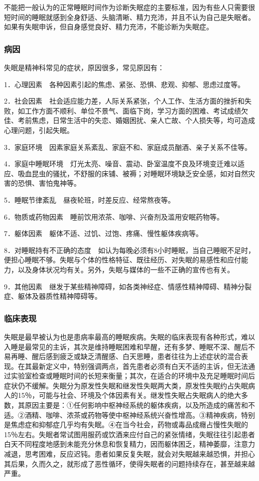 不能把一般认为的正常睡眠时间作为诊断失眠症的主要标准，因为有些人只需要很短时间的睡眠就感到全身舒适、头脑清晰、精力充沛，并且不认为自己是失眠者。如果有失眠申诉，但自身感觉良好、精力充沛，不能诊断为失眠症。

\subsubsection{病因}

失眠是精神科常见的症状，原因很多，常见原因有：

1．心理因素　各种因素引起的焦虑、紧张、恐惧、悲观、抑郁、思虑过度等。

2．社会因素　社会适应能力差，人际关系紧张，个人工作、生活方面的挫折和失败，如工作方面不顺利、单位不景气、面临下岗，学习方面的困难、考试成绩欠佳、考前焦虑，日常生活中的失恋、婚姻困扰、亲人亡故、个人损失等，均可造成心理问题，引起失眠。

3．家庭环境　因素家庭关系紊乱、家庭不和、家庭成员酗酒、亲子关系不佳等。

4．家庭中睡眠环境　灯光太亮、噪音、震动、卧室温度不良及环境变迁难以适应、吸血昆虫的骚扰，不舒服的床铺、被褥；对睡眠环境缺乏安全感，如对自然灾害的恐惧、害怕鬼神等。

5．睡眠节律紊乱　昼夜轮班，时差反应、经常熬夜等。

6．物质或药物因素　睡前饮用浓茶、咖啡、兴奋剂及滥用安眠药物等。

7．躯体因素　躯体不适、过饥、过饱、疼痛、慢性躯体疾病等。

8．对睡眠持有不正确的态度　如认为每晚必须有8小时睡眠，当自己睡眠不足时，便担心睡眠不够。失眠与个体的性格特征、既往经历、对失眠的易感性和应付能力，以及身体状况均有关。另外，失眠与媒体的一些不正确的宣传也有关。

9．其他因素　继发于某些精神障碍，如各类神经症、情感性精神障碍、精神分裂症、躯体及器质性精神障碍等。

\subsubsection{临床表现}

失眠是最早被认为也是患病率最高的睡眠疾病。失眠的临床表现有各种形式，难以入睡是最常见的主诉，其次是维持睡眠困难和早醒，还有多梦、睡眠不深、醒后不易再睡、醒后感到疲乏或缺乏清醒感、白天思睡，患者往往为上述症状的混合表现。在其最新定义中，特别强调两点，首先患者必须有白天不适的主诉，但无法通过实验室检查或睡眠时间的长短来衡量；其次，在适合的环境中及充足睡眠时间后症状仍不缓解。失眠分为原发性失眠和继发性失眠两大类，原发性失眠约占失眠病人的15％，可能与社会、环境及个体因素有关。继发性失眠占失眠病人的绝大多数，其原因主要是：①任何影响中枢神经系统的躯体疾病，以及所造成的痛苦和不适。②酒精、咖啡、浓茶或药物等使中枢神经系统兴奋性增高。③精神疾病，特别是焦虑症和抑郁症几乎均有失眠。④在当今社会，药物或毒品成癮占慢性失眠的15％左右。失眠者常试图用服药或饮酒来应付自己的紧张情绪，失眠往往引起患者白天不同程度地感到未能充分休息和恢复精力，因而躯体困乏，精神萎靡，注意力减退，思考困难，反应迟钝。患者如果反复失眠，就会对失眠越来越恐惧，并担心其后果，久而久之，就形成了恶性循环，使得失眠者的问题持续存在，甚至越来越严重。

